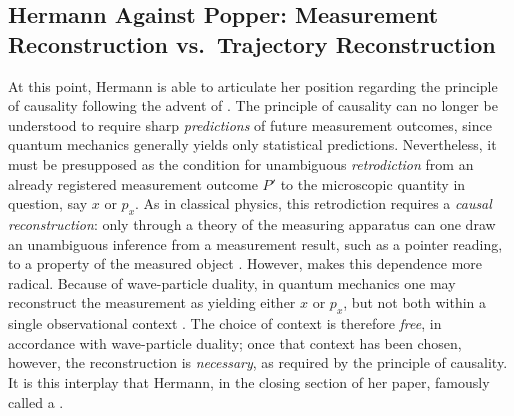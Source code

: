 \documentclass[pdflatex]{sn-jnl}
\newcommand{\NGQ}[2]{\citep[#1/#2]{Hermann1935}}
\newcommand{\NGQd}[1]{\citep[#1]{Hermann1935}}
\newcommand{\pos}{\ensuremath{x}\xspace}
\newcommand{\mom}{\ensuremath{p_x}\xspace}
\begin{document}

\subsection{Hermann Against Popper: Measurement Reconstruction vs.\ Trajectory
Reconstruction}
%
At this point, Hermann is able to articulate her position regarding the principle of causality following the advent of \qm. The principle of causality can no longer be understood to require sharp \emph{predictions} of future measurement outcomes, since quantum mechanics generally yields only statistical predictions. Nevertheless, it must be presupposed as the condition for unambiguous \emph{retrodiction} from an already registered measurement outcome $P'$ to the microscopic quantity in question, say \pos or \mom \NGQ{105-106}{272}. As in classical physics, this retrodiction requires a \emph{causal reconstruction}: only through a theory of the measuring apparatus can one draw an unambiguous inference from a measurement result, such as a pointer reading, to a property of the measured object \citep[\S12]{Hermann1935}. However, \qm makes this dependence more radical. Because of wave-particle duality, in quantum mechanics one may reconstruct the measurement as yielding either \pos or \mom, but not both within a single observational context \citep[sec.~22.3.1]{Crull2022}. The choice of context is therefore \emph{free}, in accordance with wave-particle duality; once that context has been chosen, however, the reconstruction is \emph{necessary}, as required by the \apr principle of causality. It is this interplay that Hermann, in the closing section of her paper, famously called a   \NGQd{\S18}.
\end{document}
